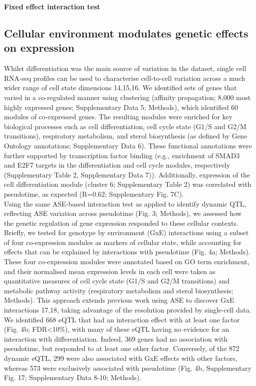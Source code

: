 \vspace{5mm}

\textbf{Fixed effect interaction test}



\subsection{Cellular environment modulates genetic effects on expression}

Whilst differentiation was the main source of variation in the dataset, single cell RNA-seq profiles can be used to characterise cell-to-cell variation across a much wider range of cell state dimensions \cite{buettner2015computational, buettner2017f, fan2016characterizing}14,15,16. 
We identified sets of genes that varied in a co-regulated manner using clustering (affinity propagation; 8,000 most highly expressed genes; Supplementary Data 5; Methods), which identified 60 modules of co-expressed genes. 
The resulting modules were enriched for key biological processes such as cell differentiation, cell cycle state (G1/S and G2/M transitions), respiratory metabolism, and sterol biosynthesis (as defined by Gene Ontology annotations; Supplementary Data 6). 
These functional annotations were further supported by transcription factor binding (e.g., enrichment of SMAD3 and E2F7 targets in the differentiation and cell cycle modules, respectively (Supplementary Table 2, Supplementary Data 7)). 
Additionally, expression of the cell differentiation module (cluster 6; Supplementary Table 2) was correlated with pseudotime, as expected (R=0.62; Supplementary Fig. 7C).\\

Using the same ASE-based interaction test as applied to identify dynamic QTL, reflecting ASE variation across pseudotime (Fig. 3; Methods), we assessed how the genetic regulation of gene expression responded to these cellular contexts. 
Briefly, we tested for genotype by environment (GxE) interactions using a subset of four co-expression modules as markers of cellular state, while accounting for effects that can be explained by interactions with pseudotime (Fig. 4a; Methods). 
These four co-expression modules were annotated based on GO term enrichment, and their normalised mean expression levels in each cell were taken as quantitative measures of cell cycle state (G1/S and G2/M transitions) and metabolic pathway activity (respiratory metabolism and sterol biosynthesis; Methods). 
This approach extends previous work using ASE to discover GxE interactions \cite{knowles2017allele, moyerbrailean2016high} 17,18, taking advantage of the resolution provided by single-cell data. 
We identified 668 eQTL that had an interaction effect with at least one factor (Fig. 4b; FDR<10\%), with many of these eQTL having no evidence for an interaction with differentiation.
Indeed, 369 genes had no association with pseudotime, but responded to at least one other factor. 
Conversely, of the 872 dynamic eQTL, 299 were also associated with GxE effects with other factors, whereas 573 were exclusively associated with pseudotime (Fig. 4b, Supplementary Fig. 17; Supplementary Data 8-10; Methods).\\

